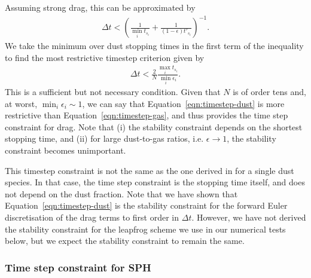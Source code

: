 \documentclass[fleqn,usenatbib]{mnras}
\begin{document}
%
Assuming strong drag, this can be approximated by
%
\begin{align}
   \Delta t < \left( \frac{1}{\min_i t_{s_i}}
      + \frac{1}{(1 - \epsilon) t'_{s_i}} \right)^{-1}.
\end{align}
%
We take the minimum over dust stopping times in the first term of the inequality
to find the most restrictive timestep criterion given by
%
\begin{align}
   \label{eqn:timestep-gas}
   \Delta t < \frac{2}{N} \frac{\max_i t_{s_i}}{\min_i \epsilon_i}.
\end{align}
%
This is a sufficient but not necessary condition. Given that \(N\) is of order
tens and, at worst, \(\min_i \epsilon_i \sim 1\), we can say that
Equation~\ref{eqn:timestep-dust} is more restrictive than
Equation~\ref{eqn:timestep-gas}, and thus provides the time step constraint for
drag. Note that (i) the stability constraint depends on the shortest stopping
time, and (ii) for large dust-to-gas ratios, i.e. \(\epsilon \rightarrow 1\),
the stability constraint becomes unimportant.

This timestep constraint is not the same as the one derived in
\citet{Laibe2012MNRAS.420.2345L} for a single dust species. In that case, the
time step constraint is the stopping time itself, and does not depend on the
dust fraction. Note that we have shown that Equation~\ref{eqn:timestep-dust} is
the stability constraint for the forward Euler discretisation of the drag terms
to first order in \(\Delta t\). However, we have not derived the stability
constraint for the leapfrog scheme we use in our numerical tests below, but we
expect the stability constraint to remain the same.

\subsubsection{Time step constraint for SPH}
\end{document}
